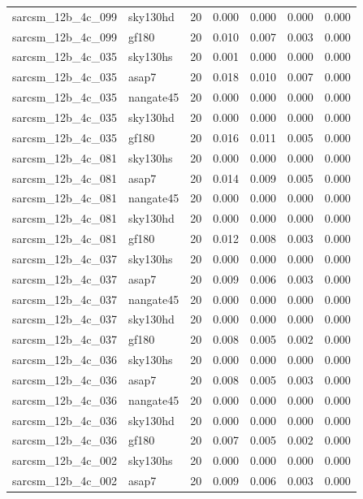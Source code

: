 \begin{tabular}{llrrrrr}
sarcsm\_12b\_4c\_099 & sky130hd & 20 & 0.000 & 0.000 & 0.000 & 0.000 \\
sarcsm\_12b\_4c\_099 & gf180 & 20 & 0.010 & 0.007 & 0.003 & 0.000 \\
sarcsm\_12b\_4c\_035 & sky130hs & 20 & 0.001 & 0.000 & 0.000 & 0.000 \\
sarcsm\_12b\_4c\_035 & asap7 & 20 & 0.018 & 0.010 & 0.007 & 0.000 \\
sarcsm\_12b\_4c\_035 & nangate45 & 20 & 0.000 & 0.000 & 0.000 & 0.000 \\
sarcsm\_12b\_4c\_035 & sky130hd & 20 & 0.000 & 0.000 & 0.000 & 0.000 \\
sarcsm\_12b\_4c\_035 & gf180 & 20 & 0.016 & 0.011 & 0.005 & 0.000 \\
sarcsm\_12b\_4c\_081 & sky130hs & 20 & 0.000 & 0.000 & 0.000 & 0.000 \\
sarcsm\_12b\_4c\_081 & asap7 & 20 & 0.014 & 0.009 & 0.005 & 0.000 \\
sarcsm\_12b\_4c\_081 & nangate45 & 20 & 0.000 & 0.000 & 0.000 & 0.000 \\
sarcsm\_12b\_4c\_081 & sky130hd & 20 & 0.000 & 0.000 & 0.000 & 0.000 \\
sarcsm\_12b\_4c\_081 & gf180 & 20 & 0.012 & 0.008 & 0.003 & 0.000 \\
sarcsm\_12b\_4c\_037 & sky130hs & 20 & 0.000 & 0.000 & 0.000 & 0.000 \\
sarcsm\_12b\_4c\_037 & asap7 & 20 & 0.009 & 0.006 & 0.003 & 0.000 \\
sarcsm\_12b\_4c\_037 & nangate45 & 20 & 0.000 & 0.000 & 0.000 & 0.000 \\
sarcsm\_12b\_4c\_037 & sky130hd & 20 & 0.000 & 0.000 & 0.000 & 0.000 \\
sarcsm\_12b\_4c\_037 & gf180 & 20 & 0.008 & 0.005 & 0.002 & 0.000 \\
sarcsm\_12b\_4c\_036 & sky130hs & 20 & 0.000 & 0.000 & 0.000 & 0.000 \\
sarcsm\_12b\_4c\_036 & asap7 & 20 & 0.008 & 0.005 & 0.003 & 0.000 \\
sarcsm\_12b\_4c\_036 & nangate45 & 20 & 0.000 & 0.000 & 0.000 & 0.000 \\
sarcsm\_12b\_4c\_036 & sky130hd & 20 & 0.000 & 0.000 & 0.000 & 0.000 \\
sarcsm\_12b\_4c\_036 & gf180 & 20 & 0.007 & 0.005 & 0.002 & 0.000 \\
sarcsm\_12b\_4c\_002 & sky130hs & 20 & 0.000 & 0.000 & 0.000 & 0.000 \\
sarcsm\_12b\_4c\_002 & asap7 & 20 & 0.009 & 0.006 & 0.003 & 0.000 \\

\end{tabular}
